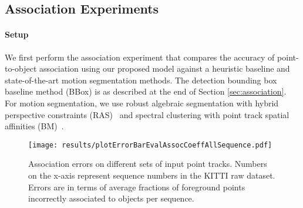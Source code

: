 \subsection{Association Experiments}

\paragraph{Setup}
We first perform the association experiment that compares the accuracy of point-to-object association using our proposed model against a heuristic baseline and state-of-the-art motion segmentation methods. The detection bounding box baseline method (BBox) is as described at the end of Section \ref{sec:association}. For motion segmentation, we use robust algebraic segmentation with hybrid perspective constraints (RAS)~\cite{Rao_etal_2010} and spectral clustering with point track spatial affinities (BM)~\cite{Brox_Malik_2010}.

\begin{figure*}[!!t]
\centering
\texttt{[image: results/plotErrorBarEvalAssocCoeffAllSequence.pdf]}
  \vspace{-0.3cm}
  \caption{Association errors on different sets of input point tracks. Numbers on the x-axis represent sequence numbers in the KITTI raw dataset. Errors are in terms of average fractions of foreground points incorrectly associated to objects per sequence.}
  \vspace{-0.3cm}
  \label{fig:assoc-occ-results}
\end{figure*}

